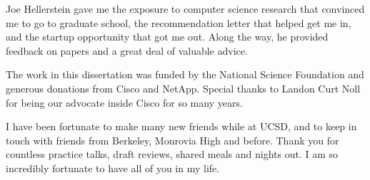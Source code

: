 \begin{acknowledgements}
Joe Hellerstein gave me the exposure to computer science research that
convinced me to go to graduate school, the recommendation letter that helped
get me in, and the startup opportunity that got me out. Along the way, he
provided feedback on papers and a great deal of valuable advice.

The work in this dissertation was funded by the National Science Foundation and
generous donations from Cisco and NetApp. Special thanks to Landon Curt Noll
for being our advocate inside Cisco for so many years.

I have been fortunate to make many new friends while at UCSD, and to keep in
touch with friends from Berkeley, Monrovia High and before. Thank you for
countless practice talks, draft reviews, shared meals and nights out. I am so
incredibly fortunate to have all of you in my life.







\end{acknowledgements}
